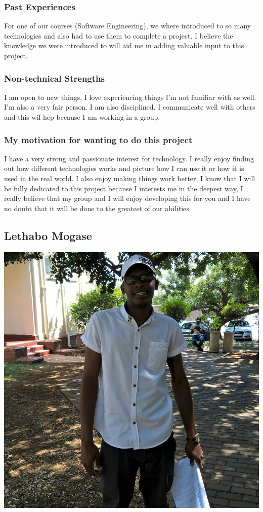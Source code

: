 \documentclass[a4paper,12pt]{article}
\begin{document}
			\subsubsection{Past Experiences}
			For one of our courses (Software Engineering), we where introduced to so many technologies and also had to use them to complete a project. I believe the knowledge we were introduced to will aid me in adding valuable input to this project.
			
			\subsubsection{Non-technical Strengths}
			I am open to new things, I love experiencing things I'm not familiar with as well. I'm also a very fair person. I am also disciplined. I communicate well with others and this wil hep because I am working in a group.
			\subsubsection{My motivation for wanting to do this project}
			I have a very strong and passionate interest for technology. I really enjoy finding out how different technologies works and picture how I can use it or  how it is used in the real world. I also enjoy making things work better. I know that I will be fully dedicated to this project because I interests me in the deepest way, I really believe that my group and I will enjoy developing this for you and I have no doubt that it will be done to the greatest of our abilities.  
		
		\newpage
		\subsection{Lethabo Mogase}
		\includegraphics[scale=0.2]{./Pictures/lethabo.jpg}\\
\end{document}
